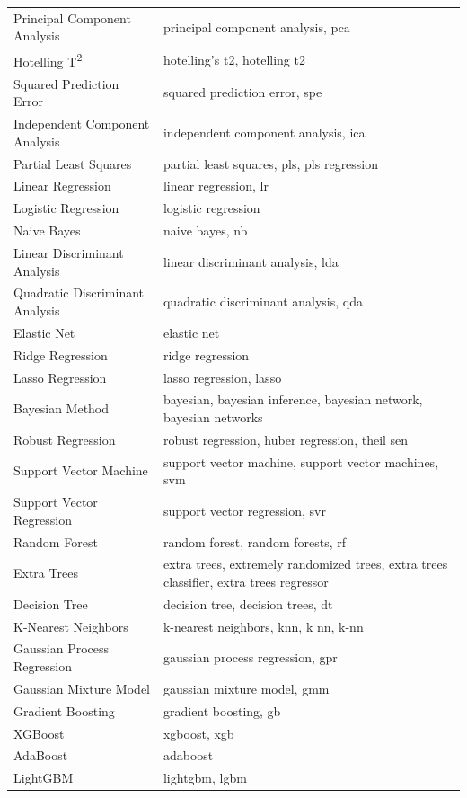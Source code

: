 \begin{xltabular}{\textwidth}{lX}
Principal Component Analysis & principal component analysis, pca \\
Hotelling T\textsuperscript{2} & hotelling's t2, hotelling t2 \\
Squared Prediction Error & squared prediction error, spe \\
Independent Component Analysis & independent component analysis, ica \\
Partial Least Squares & partial least squares, pls, pls regression \\
\addlinespace
Linear Regression & linear regression, lr \\
Logistic Regression & logistic regression \\
Naive Bayes & naive bayes, nb \\
Linear Discriminant Analysis & linear discriminant analysis, lda \\
Quadratic Discriminant Analysis & quadratic discriminant analysis, qda \\
Elastic Net & elastic net \\
Ridge Regression & ridge regression \\
Lasso Regression & lasso regression, lasso \\
Bayesian Method & bayesian, bayesian inference, bayesian network, bayesian networks \\
Robust Regression & robust regression, huber regression, theil sen \\
\addlinespace
Support Vector Machine & support vector machine, support vector machines, svm \\
Support Vector Regression & support vector regression, svr \\
Random Forest & random forest, random forests, rf \\
Extra Trees & extra trees, extremely randomized trees, extra trees classifier, extra trees regressor \\
Decision Tree & decision tree, decision trees, dt \\
K-Nearest Neighbors & k-nearest neighbors, knn, k nn, k-nn \\
Gaussian Process Regression & gaussian process regression, gpr \\
Gaussian Mixture Model & gaussian mixture model, gmm \\
Gradient Boosting & gradient boosting, gb \\
XGBoost & xgboost, xgb \\
AdaBoost & adaboost \\
LightGBM & lightgbm, lgbm \\

\end{xltabular}
